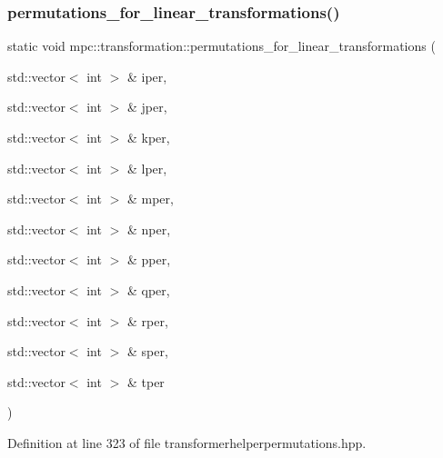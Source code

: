 \subsubsection{\texorpdfstring{permutations\+\_\+for\+\_\+linear\+\_\+transformations()}{permutations\_for\_linear\_transformations()}\hspace{0.1cm}{\footnotesize\ttfamily [11/11]}}
{\footnotesize\ttfamily static void mpc\+::transformation\+::permutations\+\_\+for\+\_\+linear\+\_\+transformations (\begin{DoxyParamCaption}\item[{std\+::vector$<$ int $>$ \&}]{iper,  }\item[{std\+::vector$<$ int $>$ \&}]{jper,  }\item[{std\+::vector$<$ int $>$ \&}]{kper,  }\item[{std\+::vector$<$ int $>$ \&}]{lper,  }\item[{std\+::vector$<$ int $>$ \&}]{mper,  }\item[{std\+::vector$<$ int $>$ \&}]{nper,  }\item[{std\+::vector$<$ int $>$ \&}]{pper,  }\item[{std\+::vector$<$ int $>$ \&}]{qper,  }\item[{std\+::vector$<$ int $>$ \&}]{rper,  }\item[{std\+::vector$<$ int $>$ \&}]{sper,  }\item[{std\+::vector$<$ int $>$ \&}]{tper }\end{DoxyParamCaption})\hspace{0.3cm}{\ttfamily [static]}}



Definition at line 323 of file transformerhelperpermutations.\+hpp.

